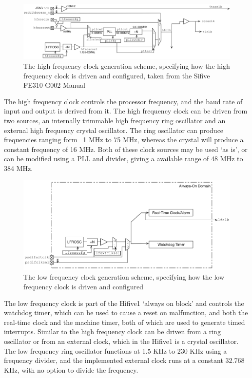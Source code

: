 \begin{figure}[H]
    \includegraphics[width=0.9\columnwidth]{figures/hfclock.png}
    \centering
    \caption[High Frequency Clock Diagram]{The high frequency clock generation scheme, specifying how the high frequency clock is driven and configured, taken from the Sifive FE310-G002 Manual\cite{sifive_manual}}
\end{figure}
The high frequency clock controls the processor frequency, and the baud rate of input and output is derived from it. The high frequency clock can be driven from two sources, an internally trimmable high frequency ring oscillator and an external high frequency crystal oscillator. The ring oscillator can produce frequencies ranging form ~1 MHz to 75 MHz, whereas the crystal will produce a constant frequency of 16 MHz. Both of these clock sources may be used `as is', or can be modified using a PLL and divider, giving a available range of 48 MHz to 384 MHz. 
\\
\begin{figure}[H]
    \includegraphics[width=0.9\columnwidth]{figures/lfclock.png}
    \centering
    \caption[Low Frequency Clock Diagram]{The low frequency clock generation scheme, specifying how the low frequency clock is driven and configured\cite{sifive_manual}}
\end{figure}
The low frequency clock is part of the Hifive1 `always on block' and controls the watchdog timer, which can be used to cause a reset on malfunction, and both the real-time clock and the machine timer, both of which are used to generate timed interrupts. Similar to the high frequency clock can be driven from a ring oscillator or from an external clock, which in the Hifive1 is a crystal oscillator. The low frequency ring oscillator functions at 1.5 KHz to 230 KHz using a frequency divider, and the implemented external clock runs at a constant 32.768 KHz, with no option to divide the frequency.
